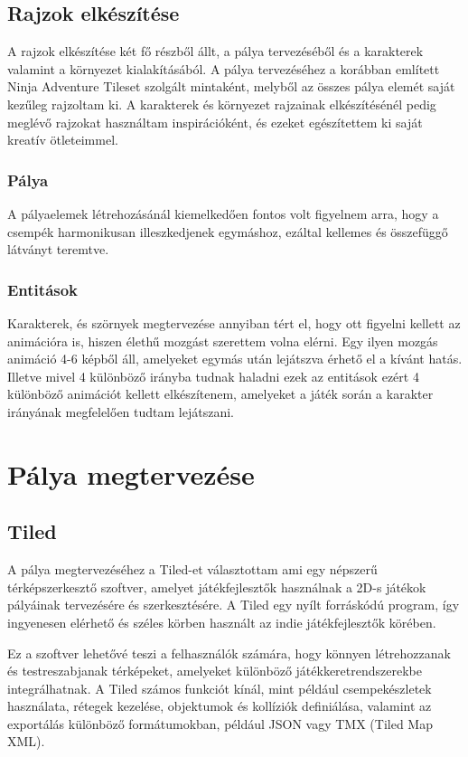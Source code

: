 \subsection{Rajzok elkészítése}

A rajzok elkészítése két fő részből állt, a pálya tervezéséből és a karakterek valamint a környezet kialakításából. A pálya tervezéséhez a korábban említett Ninja Adventure Tileset szolgált mintaként, melyből az összes pálya elemét saját kezűleg rajzoltam ki. A karakterek és környezet rajzainak elkészítésénél pedig meglévő rajzokat használtam inspirációként, és ezeket egészítettem ki saját kreatív ötleteimmel.

\subsubsection{Pálya}
A pályaelemek létrehozásánál kiemelkedően fontos volt figyelnem arra, hogy a csempék harmonikusan illeszkedjenek egymáshoz, ezáltal kellemes és összefüggő látványt teremtve.

\subsubsection{Entitások}
Karakterek, és szörnyek megtervezése annyiban tért el, hogy ott figyelni kellett az animációra is, hiszen élethű mozgást szerettem volna elérni. Egy ilyen mozgás animáció 4-6 képből áll, amelyeket egymás után lejátszva érhető el a kívánt hatás. Illetve mivel 4 különböző irányba tudnak haladni ezek az entitások ezért 4 különböző animációt kellett elkészítenem, amelyeket a játék során a karakter irányának megfelelően tudtam lejátszani.



\section{Pálya megtervezése}

\subsection{Tiled}
\label{subsec:Tiled}
A pálya megtervezéséhez a Tiled-et \cite{Tiled} választottam ami egy népszerű térképszerkesztő szoftver, amelyet játékfejlesztők használnak a 2D-s játékok pályáinak tervezésére és szerkesztésére. A Tiled egy nyílt forráskódú program, így ingyenesen elérhető és széles körben használt az indie játékfejlesztők körében.

Ez a szoftver lehetővé teszi a felhasználók számára, hogy könnyen létrehozzanak és testreszabjanak térképeket, amelyeket különböző játékkeretrendszerekbe integrálhatnak. A Tiled számos funkciót kínál, mint például csempekészletek használata, rétegek kezelése, objektumok és kollíziók definiálása, valamint az exportálás különböző formátumokban, például JSON vagy TMX (Tiled Map XML).

